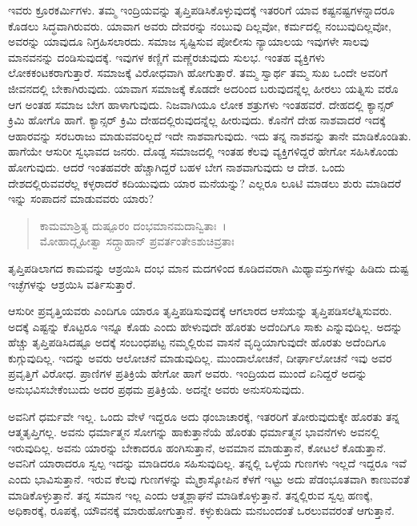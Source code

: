 ಇವರು ಕ್ರೂರಕರ್ಮಿಗಳು. ತಮ್ಮ ಇಂದ್ರಿಯವನ್ನು ತೃಪ್ತಿಪಡಿಸಿಕೊಳ್ಳುವುದಕ್ಕೆ ಇತರರಿಗೆ ಯಾವ ಕಷ್ಟನಷ್ಟಗಳನ್ನಾದರೂ ಕೊಡಲು ಸಿದ್ಧವಾಗಿರುವರು. ಯಾವಾಗ ಅವರು ದೇವರನ್ನು ನಂಬುವು ದಿಲ್ಲವೋ, ಕರ್ಮದಲ್ಲಿ ನಂಬುವುದಿಲ್ಲವೋ, ಅವರನ್ನು ಯಾವುದೂ ನಿಗ್ರಹಿಸಲಾರದು. ಸಮಾಜ ಸೃಷ್ಟಿಸುವ ಪೋಲೀಸು ನ್ಯಾಯಾಲಯ ಇವುಗಳೇ ಸಾಲವು ಮಾನವನನ್ನು ದಂಡಿಸುವುದಕ್ಕೆ. ಇವುಗಳ ಕಣ್ಣಿಗೆ ಮಣ್ಣೆರಚುವುದು ಸುಲಭ. ಇಂತಹ ವ್ಯಕ್ತಿಗಳು ಲೋಕಕಂಟಕರಾಗುತ್ತಾರೆ. ಸಮಾಜಕ್ಕೆ ವಿರೋಧವಾಗಿ ಹೋಗುತ್ತಾರೆ. ತಮ್ಮ ಸ್ವಾರ್ಥ ತಮ್ಮ ಸುಖ ಒಂದೇ ಅವರಿಗೆ ಜೀವನದಲ್ಲಿ ಬೇಕಾಗಿರುವುದು. ಯಾವಾಗ ಸಮಾಜಕ್ಕೆ ಕೊಡದೇ ಅದರಿಂದ ಬರುವುದನ್ನೆಲ್ಲ ಹೀರಲು ಯತ್ನಿಸು ವರೊ ಆಗ ಅಂತಹ ಸಮಾಜ ಬೇಗ ಹಾಳಾಗುವುದು. ನಿಜವಾಗಿಯೂ ಲೋಕ ಶತ್ರುಗಳು ಇಂತಹವರೆ. ದೇಹದಲ್ಲಿ ಕ್ಯಾನ್ಸರ್ ಕ್ರಿಮಿ ಹೋಗೊ ಹಾಗೆ. ಕ್ಯಾನ್ಸರ್ ಕ್ರಿಮಿ ದೇಹದಲ್ಲಿರುವುದನ್ನೆಲ್ಲ ಹೀರುವುದು. ಕೊನೆಗೆ ದೇಹ ನಾಶವಾದರೆ ಇದಕ್ಕೆ ಆಹಾರವನ್ನು ಸರಬರಾಜು ಮಾಡುವವರಿಲ್ಲದೆ ಇದೇ ನಾಶವಾಗುವುದು. ಇದು ತನ್ನ ನಾಶವನ್ನು ತಾನೇ ಮಾಡಿಕೊಂಡಿತು. ಹಾಗೆಯೇ ಆಸುರೀ ಸ್ವಭಾವದ ಜನರು. ದೊಡ್ಡ ಸಮಾಜದಲ್ಲಿ ಇಂತಹ ಕೆಲವು ವ್ಯಕ್ತಿಗಳಿದ್ದರೆ ಹೇಗೋ ಸಹಿಸಿಕೊಂಡು ಹೋಗುವುದು. ಆದರೆ ಇಂತಹವರೇ ಹೆಚ್ಚಾಗಿದ್ದರೆ ಬಹಳ ಬೇಗ ನಾಶವಾಗುವುದು ಆ ದೇಶ. ಒಂದು ದೇಶದಲ್ಲಿರುವವರೆಲ್ಲ ಕಳ್ಳರಾದರೆ ಕದಿಯುವುದು ಯಾರ ಮನೆಯನ್ನು? ಎಲ್ಲರೂ ಲೂಟಿ ಮಾಡಲು ಶುರು ಮಾಡಿದರೆ ಇನ್ನು ಸಂಪಾದನೆ ಮಾಡುವವರು ಯಾರು?

\begin{verse}
ಕಾಮಮಾಶ್ರಿತ್ಯ ದುಷ್ಪೂರಂ ದಂಭಮಾನಮದಾನ್ವಿತಾಃ~।\\ಮೋಹಾದ್ಗೃಹೀತ್ವಾ ಸದ್ಗ್ರಾಹಾನ್ ಪ್ರವರ್ತಂತೇಽಶುಚಿವ್ರತಾಃ 
\end{verse}

{\small ತೃಪ್ತಿಪಡಿಲಾಗದ ಕಾಮವನ್ನು ಆಶ್ರಯಿಸಿ ದಂಭ ಮಾನ ಮದಗಳಿಂದ ಕೂಡಿದವರಾಗಿ ಮಿಥ್ಯಾವಸ್ತುಗಳನ್ನು ಹಿಡಿದು ದುಷ್ಟ ಇಚ್ಛೆಗಳನ್ನು ಆಶ್ರಯಿಸಿ ವರ್ತಿಸುತ್ತಾರೆ.}

ಆಸುರೀ ಪ್ರವೃತ್ತಿಯವರು ಎಂದಿಗೂ ಯಾರೂ ತೃಪ್ತಿಪಡಿಸುವುದಕ್ಕೆ ಆಗಲಾರದ ಆಸೆಯನ್ನು ತೃಪ್ತಿಪಡಿಸಲೆತ್ನಿಸುವರು. ಅದಕ್ಕೆ ಎಷ್ಟನ್ನು ಕೊಟ್ಟರೂ ಇನ್ನೂ ಕೊಡು ಎಂದು ಹೇಳುವುದೇ ಹೊರತು ಅದೆಂದಿಗೂ ಸಾಕು ಎನ್ನುವುದಿಲ್ಲ. ಅದನ್ನು ಹೆಚ್ಚು ತೃಪ್ತಿಪಡಿಸಿದಷ್ಟೂ ಅದಕ್ಕೆ ಸಂಬಂಧಪಟ್ಟ ನಮ್ಮಲ್ಲಿರುವ ವಾಸನೆ ವೃದ್ಧಿಯಾಗುವುದೇ ಹೊರತು ಅದೆಂದಿಗೂ ಕುಗ್ಗುವುದಿಲ್ಲ. ಇದನ್ನು ಅವರು ಆಲೋಚನೆ ಮಾಡುವುದಿಲ್ಲ. ಮುಂದಾಲೋಚನೆ, ದೀರ್ಘಾಲೋಚನೆ ಇವು ಅವರ ಪ್ರವೃತ್ತಿಗೆ ವಿರೋಧ. ಪ್ರಾಣಿಗಳ ಪ್ರತಿಕ್ರಿಯೆ ಹೇಗೋ ಹಾಗೆ ಅವರು. ಇಂದ್ರಿಯದ ಮುಂದೆ ಏನಿದ್ದರೆ ಅದನ್ನು ಅನುಭವಿಸಬೇಕೆಂಬುದು ಅದರ ಪ್ರಥಮ ಪ್ರತಿಕ್ರಿಯೆ. ಅದನ್ನೇ ಅವರು ಅನುಸರಿಸುವುದು.

ಅವನಿಗೆ ಧರ್ಮವೇ ಇಲ್ಲ. ಒಂದು ವೇಳೆ ಇದ್ದರೂ ಅದು ಢಂಬಾಚಾರಕ್ಕೆ, ಇತರರಿಗೆ ತೋರುವುದುಕ್ಕೇ ಹೊರತು ತನ್ನ ಆತ್ಮತೃಪ್ತಿಗಲ್ಲ. ಅವನು ಧರ್ಮಾತ್ಮನ ಸೋಗನ್ನು ಹಾಕುತ್ತಾನೆಯೆ ಹೊರತು ಧರ್ಮಾತ್ಮನ ಭಾವನೆಗಳು ಅವನಲ್ಲಿ ಇರುವುದಿಲ್ಲ. ಅವನು ಯಾರನ್ನು ಬೇಕಾದರೂ ಹಂಗಿಸುತ್ತಾನೆ, ಅವಮಾನ ಮಾಡುತ್ತಾನೆ, ಕೋಟಲೆ ಕೊಡುತ್ತಾನೆ. ಅವನಿಗೆ ಯಾರಾದರೂ ಸ್ವಲ್ಪ ಇದನ್ನು ಮಾಡಿದರೂ ಸಹಿಸುವುದಿಲ್ಲ. ತನ್ನಲ್ಲಿ ಒಳ್ಳೆಯ ಗುಣಗಳು ಇಲ್ಲದೆ ಇದ್ದರೂ ಇವೆ ಎಂದು ಭಾವಿಸುತ್ತಾನೆ. ಇರುವ ಕೆಲವು ಗುಣಗಳನ್ನು ಮೈಕ್ರಾಸ್ಕೋಪಿನ ಕೆಳಗೆ ಇಟ್ಟು ಅದು ಪೆಡಂಭೂತವಾಗಿ ಕಾಣುವಂತೆ ಮಾಡಿಕೊಳ್ಳುತ್ತಾನೆ. ತನ್ನ ಸಮಾನ ಇಲ್ಲ ಎಂದು ಆತ್ಮಶ್ಲಾಘನೆ ಮಾಡಿಕೊಳ್ಳುತ್ತಾನೆ. ತನ್ನಲ್ಲಿರುವ ಸ್ವಲ್ಪ ಹಣಕ್ಕೆ, ಅಧಿಕಾರಕ್ಕೆ, ರೂಪಕ್ಕೆ, ಯೌವನಕ್ಕೆ ಮಾರುಹೋಗುತ್ತಾನೆ. ಕಳ್ಳುಕುಡಿದು ಮನಬಂದಂತೆ ಒರಲುವವರಂತೆ ಆಗುತ್ತಾನೆ.

